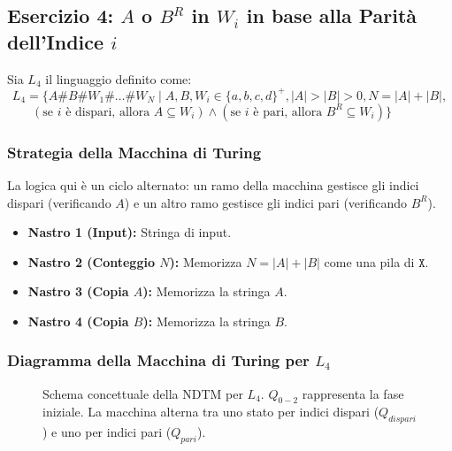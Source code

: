 \documentclass[a4paper]{article}
\newcommand{\Sh}{\texttt{\#}} %
\newcommand{\X}{\texttt{X}} %
\begin{document}
\subsection{Esercizio 4: $A$ o $B^R$ in $W_i$ in base alla Parità dell'Indice $i$}

Sia $L_4$ il linguaggio definito come:
\[
L_4 = \{A\Sh B\Sh W_1 \Sh \dots \Sh W_N \mid A, B, W_i \in \{a,b,c,d\}^+, |A|>|B|>0, N=|A|+|B|, 
\]
$\qquad (\text{se } i \text{ è dispari, allora } A \subseteq W_i) \land (\text{se } i \text{ è pari, allora } B^R \subseteq W_i) \}$

\subsubsection{Strategia della Macchina di Turing}
La logica qui è un ciclo alternato: un ramo della macchina gestisce gli indici dispari (verificando $A$) e un altro ramo gestisce gli indici pari (verificando $B^R$).
\begin{itemize}
    \item \textbf{Nastro 1 (Input):} Stringa di input.
    \item \textbf{Nastro 2 (Conteggio $N$):} Memorizza $N = |A| + |B|$ come una pila di $\X$.
    \item \textbf{Nastro 3 (Copia $A$):} Memorizza la stringa $A$.
    \item \textbf{Nastro 4 (Copia $B$):} Memorizza la stringa $B$.
\end{itemize}

\subsubsection{Diagramma della Macchina di Turing per $L_4$}
\begin{figure}[h!]
\centering
{}
\caption{Schema concettuale della NDTM per $L_4$. $Q_{0-2}$ rappresenta la fase iniziale. La macchina alterna tra uno stato per indici dispari ($Q_{dispari}$) e uno per indici pari ($Q_{pari}$).}
\end{figure}
\end{document}
